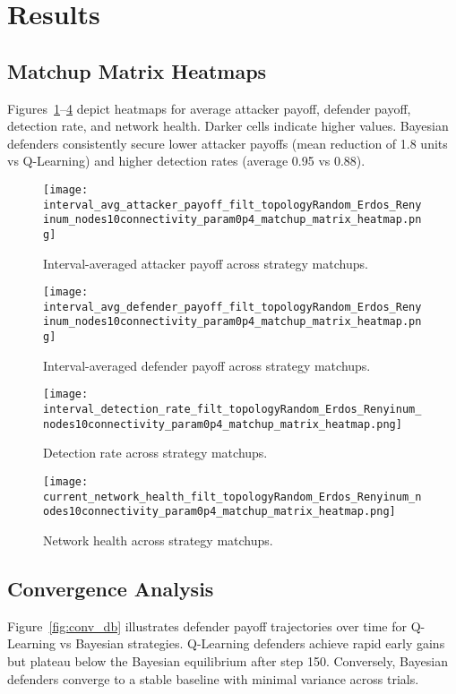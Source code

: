 \documentclass[conference]{IEEEtran}
\begin{document}
\section{Results}

\subsection{Matchup Matrix Heatmaps}
Figures~\ref{fig:atk_payoff_heatmap}--\ref{fig:health_heatmap} depict heatmaps for average attacker payoff, defender payoff, detection rate, and network health. Darker cells indicate higher values. Bayesian defenders consistently secure lower attacker payoffs (mean reduction of 1.8 units vs Q-Learning) and higher detection rates (average 0.95 vs 0.88).

\begin{figure}[htbp]
  \centering
  \texttt{[image: interval\_avg\_attacker\_payoff\_filt\_topologyRandom\_Erdos\_Renyinum\_nodes10connectivity\_param0p4\_matchup\_matrix\_heatmap.png]}
  \caption{Interval-averaged attacker payoff across strategy matchups.}
  \label{fig:atk_payoff_heatmap}
\end{figure}

\begin{figure}[htbp]
  \centering
  \texttt{[image: interval\_avg\_defender\_payoff\_filt\_topologyRandom\_Erdos\_Renyinum\_nodes10connectivity\_param0p4\_matchup\_matrix\_heatmap.png]}
  \caption{Interval-averaged defender payoff across strategy matchups.}
  \label{fig:def_payoff_heatmap}
\end{figure}

\begin{figure}[htbp]
  \centering
  \texttt{[image: interval\_detection\_rate\_filt\_topologyRandom\_Erdos\_Renyinum\_nodes10connectivity\_param0p4\_matchup\_matrix\_heatmap.png]}
  \caption{Detection rate across strategy matchups.}
  \label{fig:detection_heatmap}
\end{figure}

\begin{figure}[htbp]
  \centering
  \texttt{[image: current\_network\_health\_filt\_topologyRandom\_Erdos\_Renyinum\_nodes10connectivity\_param0p4\_matchup\_matrix\_heatmap.png]}
  \caption{Network health across strategy matchups.}
  \label{fig:health_heatmap}
\end{figure}

\subsection{Convergence Analysis}
Figure~\ref{fig:conv_db} illustrates defender payoff trajectories over time for Q-Learning vs Bayesian strategies. Q-Learning defenders achieve rapid early gains but plateau below the Bayesian equilibrium after step 150. Conversely, Bayesian defenders converge to a stable baseline with minimal variance across trials.
\end{document}
